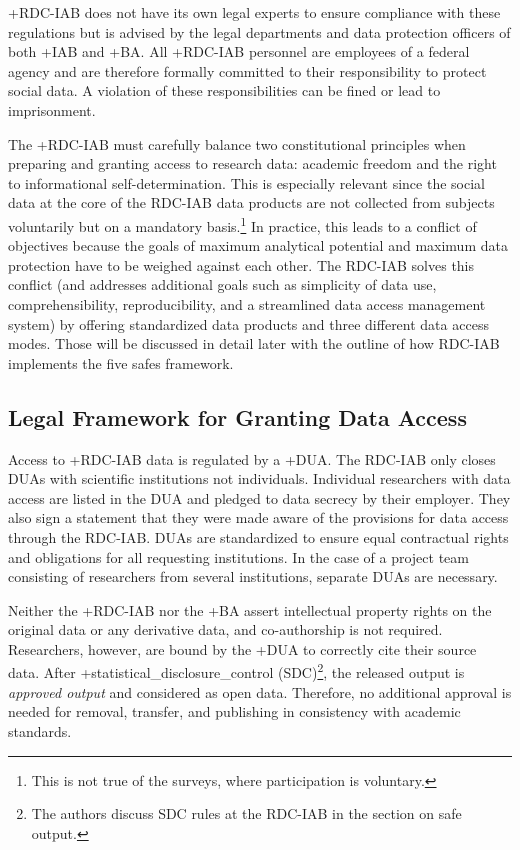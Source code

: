 \documentclass[
]{book}
\begin{document}
+RDC-IAB\textbar{} does not have its own legal experts to ensure compliance with these regulations but is advised by the legal departments and data protection officers of both +IAB\textbar{} and +BA\textbar. All +RDC-IAB\textbar{} personnel are employees of a federal agency and are therefore formally committed to their responsibility to protect social data. A violation of these responsibilities can be fined or lead to imprisonment.

The +RDC-IAB\textbar{} must carefully balance two constitutional principles when preparing and granting access to research data: academic freedom and the right to informational self-determination. This is especially relevant since the social data at the core of the RDC-IAB data products are not collected from subjects voluntarily but on a mandatory basis.\footnote{This is not true of the surveys, where participation is voluntary.} In practice, this leads to a conflict of objectives because the goals of maximum analytical potential and maximum data protection have to be weighed against each other. The RDC-IAB solves this conflict (and addresses additional goals such as simplicity of data use, comprehensibility, reproducibility, and a streamlined data access management system) by offering standardized data products and three different data access modes. Those will be discussed in detail later with the outline of how RDC-IAB implements the five safes framework.

\hypertarget{legal-framework-for-granting-data-access}{%
\subsection{Legal Framework for Granting Data Access}\label{legal-framework-for-granting-data-access}}

Access to +RDC-IAB\textbar{} data is regulated by a +DUA\textbar. The RDC-IAB only closes DUAs with scientific institutions not individuals. Individual researchers with data access are listed in the DUA and pledged to data secrecy by their employer. They also sign a statement that they were made aware of the provisions for data access through the RDC-IAB. DUAs are standardized to ensure equal contractual rights and obligations for all requesting institutions. In the case of a project team consisting of researchers from several institutions, separate DUAs are necessary.

Neither the +RDC-IAB\textbar{} nor the +BA\textbar{} assert intellectual property rights on the original data or any derivative data, and co-authorship is not required. Researchers, however, are bound by the +DUA\textbar{} to correctly cite their source data. After +statistical\_disclosure\_control\textbar{} (SDC)\footnote{The authors discuss SDC rules at the RDC-IAB in the section on safe output.}, the released output is \emph{approved output} and considered as open data. Therefore, no additional approval is needed for removal, transfer, and publishing in consistency with academic standards.
\end{document}
